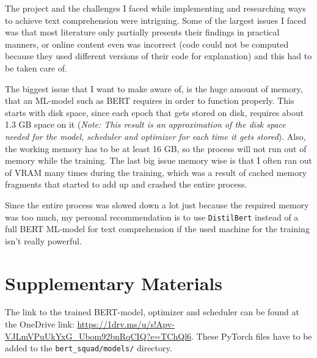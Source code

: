         The project and the challenges I faced while implementing and researching ways to achieve text comprehension were intriguing. 
        Some of the largest issues I faced was that most literature only partially presents their findings in practical manners, or online content even was incorrect (code could not be computed because they used different versions of their code for explanation) and this had to be taken care of.

        The biggest issue that I want to make aware of, is the huge amount of memory, that an ML-model such as BERT requires in order to function properly. This starts with disk space, since each epoch that gets stored on disk, requires about 1.3 GB space on it (\emph{Note: This result is an approximation of the disk space needed for the model, scheduler and optimizer for each time it gets stored}).
        Also, the working memory has to be at least 16 GB, so the process will not run out of memory while the training.
        The last big issue memory wise is that I often ran out of VRAM many times during the training, which was a result of cached memory fragments that started to add up and crashed the entire process.

        Since the entire process was slowed down a lot just because the required memory was too much, my personal recommendation is to use \texttt{DistilBert} instead of a full BERT ML-model for text comprehension if the used machine for the training isn't really powerful.

    \section{Supplementary Materials}
    \label{sec:supplementary-materials}

        The link to the trained BERT-model, optimizer and scheduler can be found at the OneDrive link: \url{https://1drv.ms/u/s!Apv-VJLmVPuUkYxG_Ubom92bnRqCIQ?e=TChQl6}. 
        These PyTorch files have to be added to the \texttt{bert\_squad/models/} directory.


    \pagebreak

    
    


